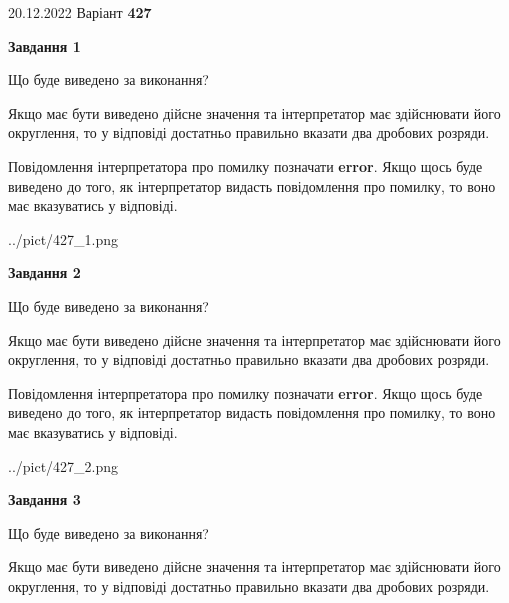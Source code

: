 \documentclass[12pt, ukrainian]{article}
\begin{document}
{20.12.2022 Варіант \No \textbf { 427 }\par}
{
\begin {Large}

{\begin {center}\textbf{Завдання 1}\end {center}}\par
Що буде виведено за виконання? \par

Якщо має бути виведено дійсне значення та інтерпретатор має здійснювати його округлення, 
то у відповіді достатньо правильно вказати два дробових розряди.

Повідомлення інтерпретатора про помилку позначати \textbf{error}.
Якщо щось буде виведено до того, як інтерпретатор видасть повідомлення про помилку, 
то воно має вказуватись у відповіді. \par

\begin{center}
	{../pict/427_1.png}
\end{center}
\newpage

{\begin {center}\textbf{Завдання 2}\end {center}}\par
Що буде виведено за виконання? \par

Якщо має бути виведено дійсне значення та інтерпретатор має здійснювати його округлення, 
то у відповіді достатньо правильно вказати два дробових розряди.

Повідомлення інтерпретатора про помилку позначати \textbf{error}.
Якщо щось буде виведено до того, як інтерпретатор видасть повідомлення про помилку, 
то воно має вказуватись у відповіді. \par

\begin{center}
	{../pict/427_2.png}
\end{center}
\newpage

{\begin {center}\textbf{Завдання 3}\end {center}}\par
Що буде виведено за виконання? \par

Якщо має бути виведено дійсне значення та інтерпретатор має здійснювати його округлення, 
то у відповіді достатньо правильно вказати два дробових розряди.


\end{Large}}
\end{document}
